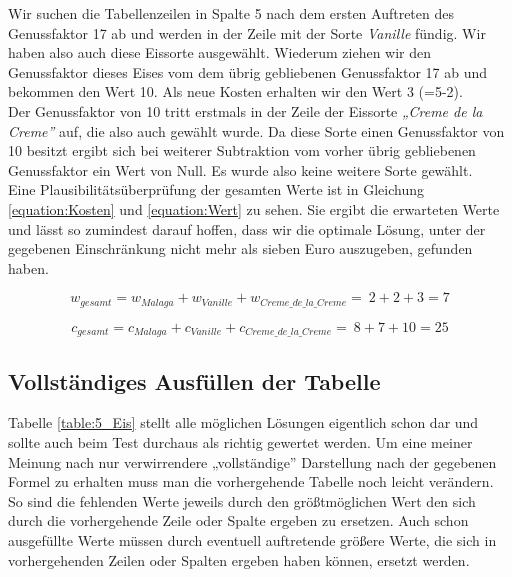 \documentclass[a4paper, 12pt]{article}
\begin{document}
Wir suchen die Tabellenzeilen in Spalte 5 nach dem ersten Auftreten des
Genussfaktor 17 ab und werden in der Zeile mit der Sorte \emph{Vanille}
fündig. Wir haben also auch diese Eissorte ausgewählt. Wiederum ziehen wir den
Genussfaktor dieses Eises vom dem übrig gebliebenen Genussfaktor 17 ab und
bekommen den Wert 10. Als neue Kosten erhalten wir den Wert 3 (=5-2).\\

Der Genussfaktor von 10 tritt erstmals in der Zeile der Eissorte \emph{„Creme
de la Creme”} auf, die also auch gewählt wurde. Da diese Sorte einen
Genussfaktor von 10 besitzt ergibt sich bei weiterer Subtraktion vom vorher
übrig gebliebenen Genussfaktor ein Wert von Null. Es wurde also keine weitere
Sorte gewählt.\\

Eine Plausibilitätsüberprüfung der gesamten Werte ist in Gleichung
\ref{equation:Kosten} und \ref{equation:Wert} zu sehen. Sie ergibt die
erwarteten Werte und lässt so zumindest darauf hoffen, dass wir die optimale
Lösung, unter der gegebenen Einschränkung nicht mehr als sieben Euro
auszugeben, gefunden haben.

\begin{equation}
	\label{equation:Kosten}
	w_{gesamt} = w_{Malaga} + w_{Vanille} + w_{Creme\_de\_la\_Creme} = \
	2 + 2 + 3 = 7
\end{equation}

\begin{equation}
	\label{equation:Wert}
	c_{gesamt} = c_{Malaga} + c_{Vanille} + c_{Creme\_de\_la\_Creme} = \
	8 + 7 + 10 = 25
\end{equation}

\subsection{Vollständiges Ausfüllen der Tabelle}

Tabelle \ref{table:5_Eis} stellt alle möglichen Lösungen eigentlich schon dar
und sollte auch beim Test durchaus als richtig gewertet werden. Um eine meiner
Meinung nach nur verwirrendere „vollständige” Darstellung nach der gegebenen
Formel zu erhalten muss man die vorhergehende Tabelle noch leicht verändern.\\

So sind die fehlenden Werte jeweils durch den größtmöglichen Wert den sich
durch die vorhergehende Zeile oder Spalte ergeben zu ersetzen. Auch schon
ausgefüllte Werte müssen durch eventuell auftretende größere Werte, die sich
in vorhergehenden Zeilen oder Spalten ergeben haben können, ersetzt werden.\\
\end{document}
